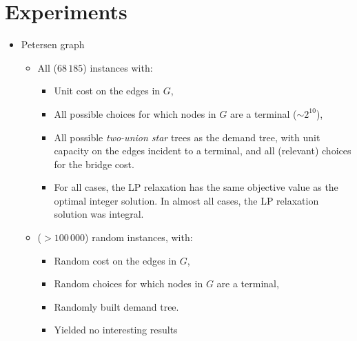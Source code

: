 \documentclass[11pt]{article}
\begin{document}
    \section{Experiments}
    \begin{itemize}
        \item Petersen graph
        \begin{itemize}
            \item All ($68\,185$) instances with:
            \begin{itemize}
                \item Unit cost on the edges in $G$,
                \item All possible choices for which nodes in $G$ are a terminal ($\sim 2^{10}$),
                \item All possible \emph{two-union star} trees as the demand tree, with unit capacity on the edges incident to a terminal, and all (relevant) choices for the bridge cost.
                \item For all cases, the LP relaxation has the same objective value as the optimal integer solution.
                In almost all cases, the LP relaxation solution was integral.
            \end{itemize}
            \item ($> 100\,000$) random instances, with:
            \begin{itemize}
                \item Random cost on the edges in $G$,
                \item Random choices for which nodes in $G$ are a terminal,
                \item Randomly built demand tree.
                \item Yielded no interesting results
            \end{itemize}
        \end{itemize}


\end{itemize}
\end{document}
